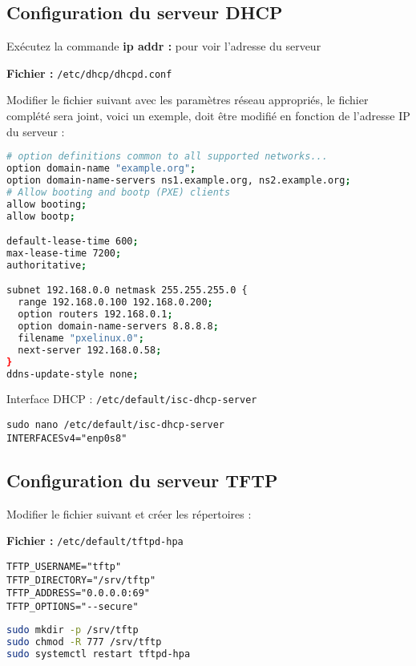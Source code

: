 \documentclass[a4paper,12pt]{article}
\begin{document}
\subsection{Configuration du serveur DHCP}

Exécutez la commande \textbf{ip addr :} pour voir l'adresse du serveur

\textbf{Fichier :} \texttt{/etc/dhcp/dhcpd.conf}

Modifier le fichier suivant avec les paramètres réseau appropriés, le fichier complété sera joint, voici un exemple, doit être modifié en fonction de l'adresse IP du serveur :

\begin{lstlisting}[language=bash]
# option definitions common to all supported networks...
option domain-name "example.org";
option domain-name-servers ns1.example.org, ns2.example.org;
# Allow booting and bootp (PXE) clients
allow booting;
allow bootp;

default-lease-time 600;
max-lease-time 7200;
authoritative;

subnet 192.168.0.0 netmask 255.255.255.0 {
  range 192.168.0.100 192.168.0.200;
  option routers 192.168.0.1;
  option domain-name-servers 8.8.8.8;
  filename "pxelinux.0";
  next-server 192.168.0.58;
}
ddns-update-style none;

\end{lstlisting}
Interface DHCP : \texttt{/etc/default/isc-dhcp-server}
\begin{lstlisting}
sudo nano /etc/default/isc-dhcp-server
INTERFACESv4="enp0s8"
\end{lstlisting}


\subsection{Configuration du serveur TFTP}

Modifier le fichier suivant et créer les répertoires :

\textbf{Fichier :} \texttt{/etc/default/tftpd-hpa}
\begin{lstlisting}
TFTP_USERNAME="tftp"
TFTP_DIRECTORY="/srv/tftp"
TFTP_ADDRESS="0.0.0.0:69"
TFTP_OPTIONS="--secure"
\end{lstlisting}

\begin{lstlisting}[language=bash]
sudo mkdir -p /srv/tftp
sudo chmod -R 777 /srv/tftp
sudo systemctl restart tftpd-hpa
\end{lstlisting}
\end{document}
